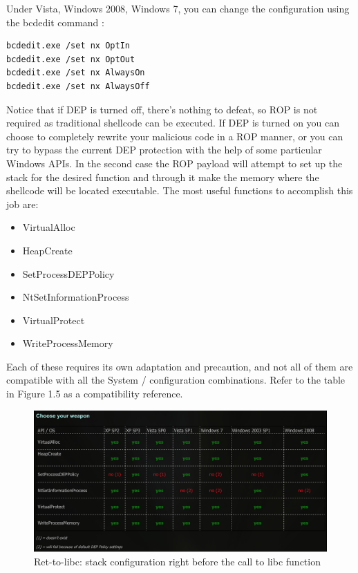 \documentclass[Lau,binding=0.6cm]{sapthesis}
\begin{document}
Under Vista, Windows 2008, Windows 7, you can change the configuration using the bcdedit command :
\begin{verbatim}
bcdedit.exe /set nx OptIn
bcdedit.exe /set nx OptOut
bcdedit.exe /set nx AlwaysOn
bcdedit.exe /set nx AlwaysOff
\end{verbatim}

Notice that if DEP is turned off, there’s nothing to defeat, so ROP is not required as traditional shellcode can be executed. If DEP is turned on you can choose to completely rewrite your malicious code in a ROP manner, or you can try to bypass the current DEP protection with the help of some particular Windows APIs. In the second case the ROP payload will attempt to set up the stack for the desired function and through it make the memory where the shellcode will be located executable. The most useful functions to accomplish this job are:
\begin{itemize}
\item VirtualAlloc
\item HeapCreate
\item SetProcessDEPPolicy
\item NtSetInformationProcess
\item VirtualProtect
\item WriteProcessMemory
\end{itemize}

Each of these requires its own adaptation and precaution, and not all of them are compatible with all the System / configuration combinations. Refer to the table in Figure 1.5 as a compatibility reference.

\begin{figure}
\centering
\includegraphics[width=1\textwidth]{windepapi}
\caption{Ret-to-libc: stack configuration right before the call to libc function}
\label{fig:largenenough}
\end{figure}
\end{document}

